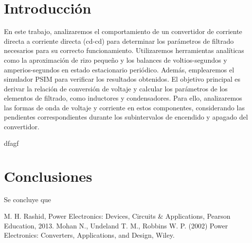 \documentclass[conference]{IEEEtran}
\begin{document}
\section{Introducción}
\vspace{-4pt}
En este trabajo, analizaremos el comportamiento de un convertidor de corriente directa a corriente directa (cd-cd) para determinar los parámetros de filtrado necesarios para su correcto funcionamiento. Utilizaremos herramientas analíticas como la aproximación de rizo pequeño y los balances de voltios-segundos y amperios-segundos en estado estacionario periódico. Además, emplearemos el simulador PSIM para verificar los resultados obtenidos.
El objetivo principal es derivar la relación de conversión de voltaje y calcular los parámetros de los elementos de filtrado, como inductores y condensadores. Para ello, analizaremos las formas de onda de voltaje y corriente en estos componentes, considerando las pendientes correspondientes durante los subintervalos de encendido y apagado del convertidor.



dfagf




\section{Conclusiones}
Se concluye que 

\begin{thebibliography}{plain}
 M. H. Rashid, Power Electronics: Devices, Circuits \& Applications, Pearson Education, 2013.
 Mohan N., Undeland T. M., Robbins W. P. (2002) Power Electronics: Converters, Applications, and Design, Wiley.
\end{thebibliography}
\end{document}
